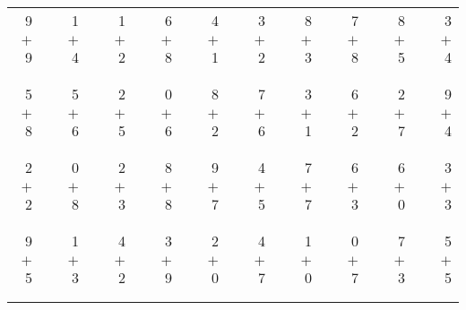 \documentclass[12pt, letterpaper]{article}
\begin{document}
\begin{tabular}{rrrrrrrrrrrrrrrrrrr}
9 & & 1 & & 1 & & 6 & & 4 & & 3 & & 8 & & 7 & & 8 & & 3\\
$+$ 9 & & $+$ 4 & & $+$ 2 & & $+$ 8 & & $+$ 1 & & $+$ 2 & & $+$ 3 & & $+$ 8 & & $+$ 5 & & $+$ 4\\
\cline{1-1} \cline{3-3} \cline{5-5} \cline{7-7} \cline{9-9} \cline{11-11} \cline{13-13} \cline{15-15} \cline{17-17} \cline{19-19} \\ \\
5 & & 5 & & 2 & & 0 & & 8 & & 7 & & 3 & & 6 & & 2 & & 9\\
$+$ 8 & & $+$ 6 & & $+$ 5 & & $+$ 6 & & $+$ 2 & & $+$ 6 & & $+$ 1 & & $+$ 2 & & $+$ 7 & & $+$ 4\\
\cline{1-1} \cline{3-3} \cline{5-5} \cline{7-7} \cline{9-9} \cline{11-11} \cline{13-13} \cline{15-15} \cline{17-17} \cline{19-19} \\ \\
2 & & 0 & & 2 & & 8 & & 9 & & 4 & & 7 & & 6 & & 6 & & 3\\
$+$ 2 & & $+$ 8 & & $+$ 3 & & $+$ 8 & & $+$ 7 & & $+$ 5 & & $+$ 7 & & $+$ 3 & & $+$ 0 & & $+$ 3\\
\cline{1-1} \cline{3-3} \cline{5-5} \cline{7-7} \cline{9-9} \cline{11-11} \cline{13-13} \cline{15-15} \cline{17-17} \cline{19-19} \\ \\
9 & & 1 & & 4 & & 3 & & 2 & & 4 & & 1 & & 0 & & 7 & & 5\\
$+$ 5 & & $+$ 3 & & $+$ 2 & & $+$ 9 & & $+$ 0 & & $+$ 7 & & $+$ 0 & & $+$ 7 & & $+$ 3 & & $+$ 5\\
\cline{1-1} \cline{3-3} \cline{5-5} \cline{7-7} \cline{9-9} \cline{11-11} \cline{13-13} \cline{15-15} \cline{17-17} \cline{19-19} \\ \\
\end{tabular}
\newpage
\end{document}
